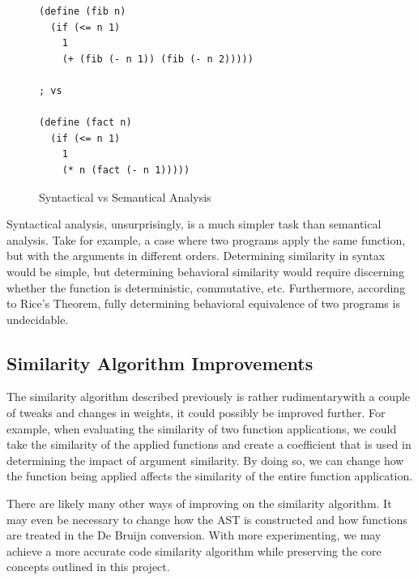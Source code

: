 \documentclass[12pt]{article}
\begin{document}
\begin{figure}[H]
  \begin{mdframed}
    \begin{lstlisting}[escapechar=\%]
(define (fib n)
  (if (<= n 1)
    1
    (+ (fib (- n 1)) (fib (- n 2)))))

; vs

(define (fact n)
  (if (<= n 1)
    1
    (* n (fact (- n 1)))))
    \end{lstlisting}
  \end{mdframed}
  \caption{Syntactical vs Semantical Analysis}
  \label{syntax-vs-sematics}
\end{figure}

Syntactical analysis, unsurprisingly, is a much simpler task than semantical analysis. Take for example, a case where two programs apply the same function, but with the arguments in different orders. Determining similarity in syntax would be simple, but determining behavioral similarity would require discerning whether the function is deterministic, commutative, etc. Furthermore, according to Rice's Theorem, fully determining behavioral equivalence of two programs is undecidable.

\subsection{Similarity Algorithm Improvements}

The similarity algorithm described previously is rather rudimentary\textemdash with a couple of tweaks and changes in weights, it could possibly be improved further. For example, when evaluating the similarity of two function applications, we could take the similarity of the applied functions and create a coefficient that is used in determining the impact of argument similarity. By doing so, we can change how the function being applied affects the similarity of the entire function application. 

\hfill

There are likely many other ways of improving on the similarity algorithm. It may even be necessary to change how the AST is constructed and how functions are treated in the De Bruijn conversion. With more experimenting, we may achieve a more accurate code similarity algorithm while preserving the core concepts outlined in this project.
\end{document}
